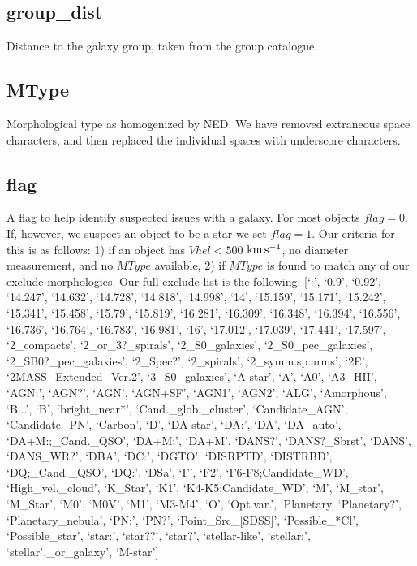 \documentclass[twocolumn,tighten]{aastex62}
\newcommand{\kms}{$\rm km\, s^{-1}$}
\begin{document}
\subsection{group\_dist} \label{group_dist}
Distance to the galaxy group, taken from the \cite{tully2015} group catalogue.

\subsection{MType} \label{MType}
Morphological type as homogenized by NED. We have removed extraneous space characters, and then replaced the individual spaces with underscore characters.

\subsection{flag} \label{flag}
A flag to help identify suspected issues with a galaxy. For most objects $flag=0$. If, however, we suspect an object to be a star we set $flag=1$. Our criteria for this is as follows: 1) if an object has $Vhel < 500$ \kms, no diameter measurement, and no $MType$ available, 2) if $MType$ is found to match any of our exclude morphologies. Our full exclude list is the following: [`:', `0.9', `0.92', `14.247', `14.632', `14.728', `14.818', `14.998', `14', `15.159', `15.171', `15.242', `15.341', `15.458', `15.79', `15.819', `16.281', `16.309', `16.348', `16.394', `16.556', `16.736', `16.764', `16.783', `16.981', `16', `17.012', `17.039', `17.441', `17.597', `2\_compacts', `2\_or\_3?\_spirals', `2\_S0\_galaxies', `2\_S0\_pec\_galaxies', `2\_SB0?\_pec\_galaxies', `2\_Spec?', `2\_spirals', `2\_symm.sp.arms', `2E', `2MASS\_Extended\_Ver.2', `3\_S0\_galaxies', `A-star', `A', `A0', `A3\_HII', `AGN:', `AGN?', `AGN', `AGN+SF', `AGN1', `AGN2', `ALG', `Amorphous', `B...', `B', `bright\_near*', `Cand.\_glob.\_cluster', `Candidate\_AGN', `Candidate\_PN', `Carbon', `D', `DA-star', `DA:', `DA', `DA\_auto', `DA+M:;\_Cand.\_QSO', `DA+M:', `DA+M', `DANS?', `DANS?\_Sbrst', `DANS', `DANS\_WR?', `DBA', `DC:', `DGTO', `DISRPTD', `DISTRBD', `DQ;\_Cand.\_QSO', `DQ:', `DSa', `F', `F2', `F6-F8;Candidate\_WD', `High\_vel.\_cloud', `K\_Star', `K1', `K4-K5;Candidate\_WD', `M', `M\_star', `M\_Star', `M0', `M0V', `M1', `M3-M4', `O', `Opt.var.', `Planetary, `Planetary?', `Planetary\_nebula', `PN:', `PN?', `Point\_Src\_[SDSS]', `Possible\_*Cl', `Possible\_star', `star:', `star??', `star?', `stellar-like', `stellar:', `stellar',\_or\_galaxy', `M-star']

\end{document}
